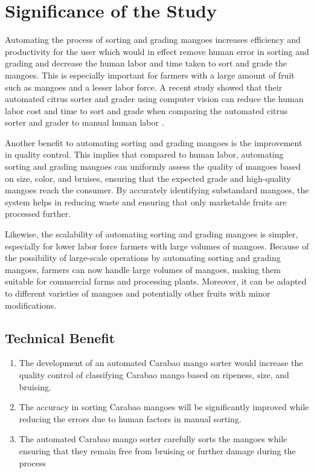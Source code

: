 
\section{Significance of the Study}

Automating the process of sorting and grading mangoes increases efficiency and 
productivity for the user which would in effect remove human error in sorting and
 grading and decrease the human labor and time taken to sort and grade the mangoes.
  This is especially important for farmers with a large amount of fruit such as mangoes and a
   lesser labor force. A recent study showed that
    their automated citrus sorter and grader using computer vision can reduce the human
	 labor cost and time to sort and grade when comparing the automated citrus sorter and grader
	  to manual human labor \cite{chakraborty-development-2023}. 

Another benefit to automating sorting and grading mangoes is the improvement in quality control.
 This implies that compared to human labor, automating sorting and grading mangoes can uniformly 
 assess the quality of mangoes based on size, color, and \gls{bruises}, ensuring that the expected grade and high-quality mangoes reach the consumer. By accurately identifying substandard mangoes, the system 
  helps in reducing waste and ensuring that only marketable fruits are processed further.

Likewise, the scalability of automating sorting and grading mangoes is simpler, especially 
for lower labor force farmers with large volumes of mangoes. Because of the possibility of
 large-scale operations by automating sorting and grading mangoes, farmers can now handle large
  volumes of mangoes, making them suitable for commercial farms and processing plants. Moreover,
   it can be adapted to different varieties of mangoes and potentially other fruits with minor modifications.


\subsection{Technical Benefit}

\begin{enumerate}
	\item The development of an automated \gls{Carabao mango} sorter would increase the quality control 
	of classifying \gls{Carabao mango} based on ripeness, size, and bruising.
	
	\item The accuracy in sorting Carabao mangoes will be significantly improved while
	 reducing the errors due to human factors in manual sorting.
	
	\item The automated \gls{Carabao mango}  sorter carefully sorts the mangoes 
	while ensuring that they remain free from bruising or further damage during the process	
\end{enumerate}

